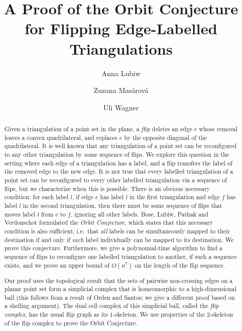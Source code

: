 \documentclass[a4paper]{article}
\title{A Proof of the Orbit Conjecture for Flipping Edge-Labelled Triangulations}
\date{}
\author[1]{Anna Lubiw}
\author[2]{Zuzana Mas\'arov\'a}
\author[2]{Uli Wagner}
\affil[1]{School of Computer Science, University of Waterloo\\
 Waterloo, ON, Canada, N2L 3G1\\
  \texttt{alubiw@uwaterloo.ca}}
\affil[2]{IST Austria\\
  Am Campus 1, 3400 Klosterneuburg, Austria\\
  \texttt{zuzana.masarova@ist.ac.at, uli@ist.ac.at}}
\theoremstyle{plain}
\theoremstyle{definition}
\theoremstyle{remark}
\begin{document}
\maketitle

\begin{abstract}
Given a triangulation of a point set in the plane, a \emph{flip} deletes an edge $e$ whose removal leaves a convex quadrilateral, and replaces $e$ by the opposite diagonal of the quadrilateral. 
It is well known that any triangulation of a point set can be reconfigured to any other triangulation by some sequence of flips.
We explore this question in the setting where each edge of a triangulation has a label, and a flip transfers the label of the removed edge to the new edge.
It is not true that every labelled triangulation of a point set can be reconfigured to every other labelled triangulation via a sequence of flips, but we characterize when this is possible.
There is an obvious necessary condition: for each label $l$,  
if edge $e$ has label $l$ in the first triangulation and edge $f$ has label $l$ in the second triangulation,
then there must be some sequence of flips that moves label $l$ from $e$ to $f$, ignoring all other labels.   
Bose, Lubiw, Pathak and Verdonschot 
formulated the \emph{Orbit Conjecture}, which states
that this necessary condition is also sufficient, i.e.~that \emph{all} labels can be simultaneously mapped to their destination if and only if \emph{each} label individually can be mapped to its destination.
We prove this conjecture. %
Furthermore, we give a polynomial-time algorithm to find a sequence of flips 
to reconfigure one labelled triangulation to another, if such a sequence exists, and
we prove an upper bound of $O(n^7)$ %
on the length of the flip sequence.  


Our proof uses the topological %
result %
that 
the sets of pairwise non-crossing edges on a planar point set form 
a simplicial complex that 
is homeomorphic to a high-dimensional ball 
(this follows from a result of Orden and Santos; we 
give a different proof based 
on a shelling argument). 
The dual cell complex of this simplicial ball, 
called the
\emph{flip complex}, has the usual flip graph as its $1$-skeleton.  We use properties 
of the $2$-skeleton of the flip complex %
to prove the Orbit Conjecture.


\end{abstract}
\end{document}
